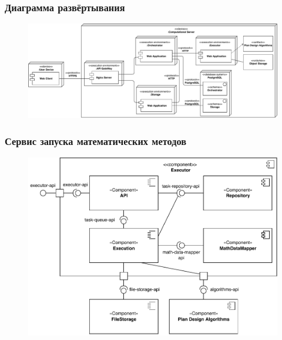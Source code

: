 \begin{frame}
\frametitle{Диаграмма развёртывания}
\begin{figure}
    \includegraphics[scale=.49]{pictures/architecture/deployment}
\end{figure}
\end{frame}

\begin{frame}
\frametitle{Сервис запуска математических методов}
\begin{figure}
    \includegraphics[scale=.6]{pictures/architecture/executor_component_common}
\end{figure}
\end{frame}

